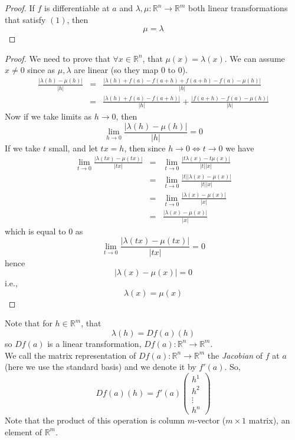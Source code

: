 \documentclass[a4paper,14pt]{extarticle}
\theoremstyle{definition}
\begin{document}
\begin{proof}
	If $f$ is differentiable at $a$ and $\lambda,\mu:\mathbb{R}^n\rightarrow\mathbb{R}^m$ both linear transformations that satisfy $(1)$, then \[\mu=\lambda\]
\end{proof}

\begin{proof}
	We need to prove that $\forall x\in\mathbb{R}^n$, that $\mu(x)=\lambda(x)$. We can assume $x\neq0$ since as $\mu,\lambda$ are linear (so they map $0$ to $0$). 
	\begin{eqnarray*}
		\frac{|\lambda(h)-\mu(h)|}{|h|}&=&\frac{|\lambda(h)+f(a)-f(a+h)+f(a+h)-f(a)-\mu(h)|}{|h|} \\
			&=&\frac{|\lambda(h)+f(a)-f(a+h)|}{|h|}+\frac{|f(a+h)-f(a)-\mu(h)|}{|h|}
	\end{eqnarray*}
	Now if we take limits as $h\to0$, then \[\lim\limits_{h\to0}\frac{|\lambda(h)-\mu(h)|}{|h|}=0\] If we take $t$ small, and let $tx=h$, then since $h\to0\iff t\to0$ we have
	\begin{eqnarray*}
		\lim\limits_{t\to0}\frac{|\lambda(tx)-\mu(tx)|}{|tx|}&=&\lim\limits_{t\to0}\frac{|t\lambda(x)-t\mu(x)|}{|t||x|}\\
				&=&\lim\limits_{t\to0}\frac{|t||\lambda(x)-\mu(x)|}{|t||x|}\\
				&=&\lim\limits_{t\to0}\frac{|\lambda(x)-\mu(x)|}{|x|}\\
				&=&\frac{|\lambda(x)-\mu(x)|}{|x|}
	\end{eqnarray*}
	which is equal to 0 as \[\lim\limits_{t\to0}\frac{|\lambda(tx)-\mu(tx)|}{|tx|}=0\] hence \[|\lambda(x)-\mu(x)|=0\] i.e., \[\lambda(x)=\mu(x)\]
\end{proof}

Note that for $h\in\mathbb{R}^m$, that \[\lambda(h)=Df(a)(h)\] so $Df(a)$ is a linear transformation, $Df(a):\mathbb{R}^n\rightarrow\mathbb{R}^m$. \\

We call the matrix representation of $Df(a):\mathbb{R}^n\rightarrow\mathbb{R}^m$ the \emph{Jacobian} of $f$ at $a$ (here we use the standard basis) and we denote it by
$f'(a)$. So, \[Df(a)(h)=f'(a)\begin{pmatrix}h^1\\h^2\\\vdots\\h^n\end{pmatrix}\] Note that the product of this operation is column $m$-vector ($m\times1$ matrix), an element of
$\mathbb{R}^m$.
\end{document}
